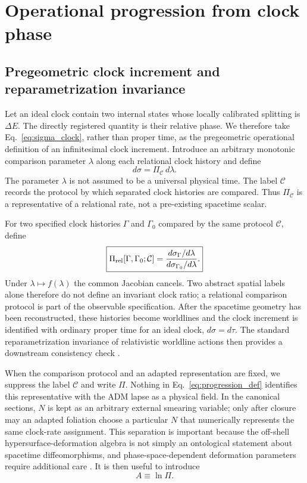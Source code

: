 \documentclass[11pt]{article}
\begin{document}
\section{Operational progression from clock phase}

\subsection{Pregeometric clock increment and reparametrization invariance}

Let an ideal clock contain two internal states whose locally calibrated splitting is $\Delta E$. The directly registered quantity is their relative phase. We therefore take Eq.~\eqref{eq:sigma_clock}, rather than proper time, as the pregeometric operational definition of an infinitesimal clock increment. Introduce an arbitrary monotonic comparison parameter $\lambda$ along each relational clock history and define
\begin{equation}
    \boxed{d\sigma=\Pi_{\mathcal C}\,d\lambda.}
    \label{eq:progression_def}
\end{equation}
The parameter $\lambda$ is not assumed to be a universal physical time. The label $\mathcal C$ records the protocol by which separated clock histories are compared. Thus $\Pi_{\mathcal C}$ is a representative of a relational rate, not a pre-existing spacetime scalar.

For two specified clock histories $\Gamma$ and $\Gamma_0$ compared by the same protocol $\mathcal C$, define
\begin{equation}
    \boxed{
    \Pi_{\rm rel}[\Gamma,\Gamma_0;\mathcal C]
    =\frac{d\sigma_\Gamma/d\lambda}{d\sigma_{\Gamma_0}/d\lambda}.}
    \label{eq:pi_rel}
\end{equation}
Under $\lambda\mapsto f(\lambda)$ the common Jacobian cancels. Two abstract spatial labels alone therefore do not define an invariant clock ratio; a relational comparison protocol is part of the observable specification. After the spacetime geometry has been reconstructed, these histories become worldlines and the clock increment is identified with ordinary proper time for an ideal clock, $d\sigma=d\tau$. The standard reparametrization invariance of relativistic worldline actions then provides a downstream consistency check \cite{Roura2020}.

When the comparison protocol and an adapted representation are fixed, we suppress the label $\mathcal C$ and write $\Pi$. Nothing in Eq.~\eqref{eq:progression_def} identifies this representative with the ADM lapse as a physical field. In the canonical sections, $N$ is kept as an arbitrary external smearing variable; only after closure may an adapted foliation choose a particular $N$ that numerically represents the same clock-rate assignment. This separation is important because the off-shell hypersurface-deformation algebra is not simply an ontological statement about spacetime diffeomorphisms, and phase-space-dependent deformation parameters require additional care \cite{Thiemann2024,Bojowald2025}. It is then useful to introduce
\begin{equation}
    \boxed{A\equiv\ln\Pi.}
    \label{eq:A_def}
\end{equation}
\end{document}
